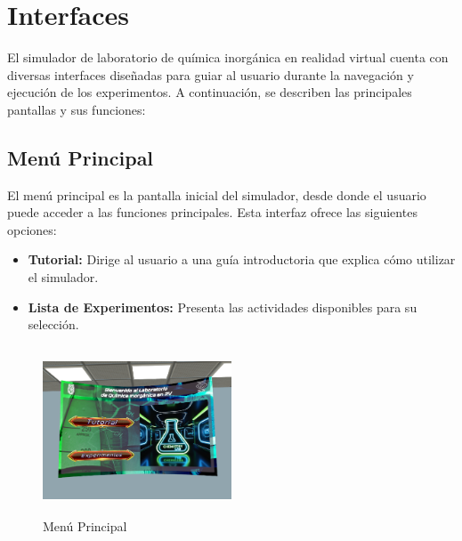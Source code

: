 \section{Interfaces}

El simulador de laboratorio de química inorgánica en realidad virtual cuenta con diversas interfaces diseñadas para guiar al usuario durante la navegación y ejecución de los experimentos. A continuación, se describen las principales pantallas y sus funciones:

\subsection{Menú Principal}
El menú principal es la pantalla inicial del simulador, desde donde el usuario puede acceder a las funciones principales. Esta interfaz ofrece las siguientes opciones:
\begin{itemize}
    \item \textbf{Tutorial:} Dirige al usuario a una guía introductoria que explica cómo utilizar el simulador.
    \item \textbf{Lista de Experimentos:} Presenta las actividades disponibles para su selección.
\end{itemize}
\begin{figure}[thbp]
    \centering
    \includegraphics[width=0.5\textwidth, height = 5cm]{img/GUI/UI_Hub.png}
    \caption{Menú Principal}
    \label{fig:Menú_Principal}
\end{figure}

